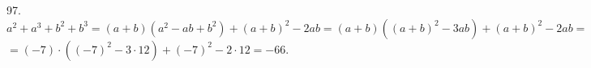 97. $a^2+a^3+b^2+b^3=(a+b)(a^2-ab+b^2)+(a+b)^2-2ab=(a+b)((a+b)^2-3ab)+(a+b)^2-2ab=$\\$=(-7)\cdot((-7)^2-3\cdot12)+(-7)^2-2\cdot12=-66.$\\
